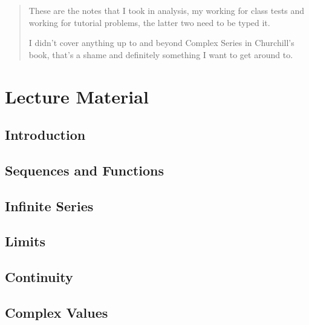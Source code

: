 \documentclass[fleqn, 10pt, titlepage, twoside]{report}
\begin{document}
\tableofcontents
\setcounter{tocdepth}{4}
\begin{abstract}
These are the notes that I took in analysis, my working for class tests and working for tutorial problems, the latter two need to be typed it.

I didn't cover anything up to and beyond Complex Series in Churchill's book, that's a shame and definitely something I want to get around to.
\end{abstract}

\part{Lecture Material}

\chapter{Introduction}


\chapter{Sequences and Functions}


\chapter{Infinite Series}

 \chapter{Limits}
 

 \chapter{Continuity}



 
 \chapter{Complex Values}
 
\end{document}
